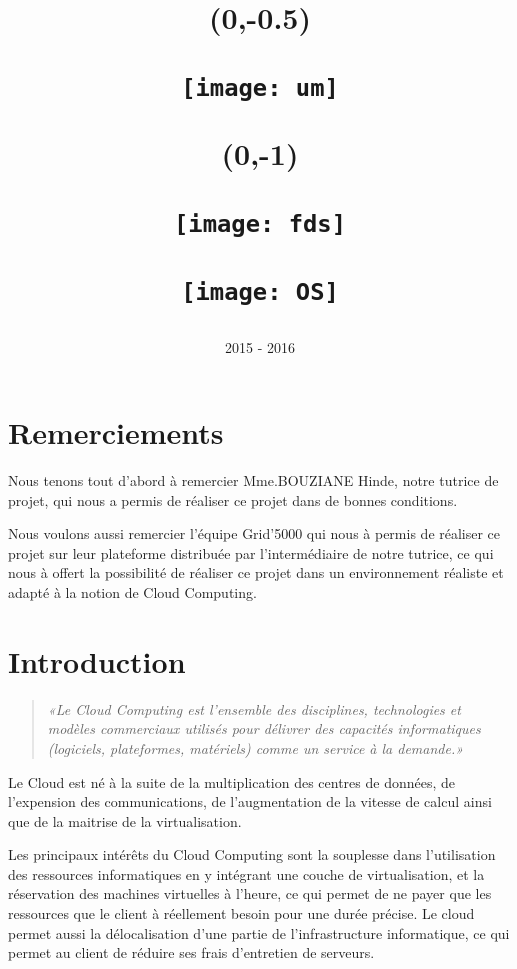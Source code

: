 \documentclass{report}
\title{
    \begin{textblock}{\textwidth}(0,-0.5)
        \begin{flushleft}
            \texttt{[image: um]}
        \end{flushleft}
    \end{textblock}
    \begin{textblock}{\textwidth}(0,-1)
        \begin{flushright}
            \texttt{[image: fds]}
        \end{flushright}
    \end{textblock}
    \vspace{3 cm}
    \begin{minipage}\linewidth
    \vspace{3 cm}
        \huge\centering{
            RAPPORT DE PROJET\break
            Prise en main d'un environnement de Cloud : OpenStack
        }
        \vspace{1 cm}\bigbreak
        \texttt{[image: OS]}
    \end{minipage}
}
\author{%
    \begin{minipage}\linewidth
        \centering{
            Groupe : \break
            BENAIS Charles,\break
            BRESSAND Jérémy,\break
            CULTY Alexandre,\break
            ROGLIANO Théo\bigbreak
            Tutrice : BOUZIANE Hinde
        }
    \end{minipage}
    \vspace{1 cm}
    \date{2015 - 2016}
}
\begin{document}

\maketitle %

\tableofcontents %

\large %


\newpage
\chapter*{Remerciements}
    Nous tenons tout d'abord à remercier Mme.BOUZIANE Hinde, notre tutrice de projet, qui nous a permis de réaliser ce projet dans de bonnes conditions.\bigbreak

    Nous voulons aussi remercier l'équipe Grid'5000 qui nous à permis de réaliser ce projet sur leur plateforme distribuée par l'intermédiaire de notre tutrice, ce qui nous à offert la possibilité de réaliser ce projet dans un environnement réaliste et adapté à la notion de Cloud Computing.



\newpage
\chapter{Introduction}

    \begin{quote}
        \textit{«Le Cloud Computing est l'ensemble des disciplines, technologies et modèles commerciaux utilisés pour délivrer des capacités informatiques (logiciels, plateformes, matériels) comme un service à la demande.» \cite{cloud_computing}} 
    \end{quote}
    \bigbreak

    Le Cloud est né à la suite de la multiplication des centres de données, de l'expension des communications, de l'augmentation de la vitesse de calcul ainsi que de la maitrise de la virtualisation.
    \bigbreak
    
    Les principaux intérêts du Cloud Computing sont la souplesse dans l'utilisation des ressources informatiques en y intégrant une couche de virtualisation, et la réservation des machines virtuelles à l'heure, ce qui permet de ne payer que les ressources que le client à réellement besoin pour une durée précise.
    Le cloud permet aussi la délocalisation d'une partie de l'infrastructure informatique, ce qui permet au client de réduire ses frais d'entretien de serveurs.\bigbreak
    
\end{document}
